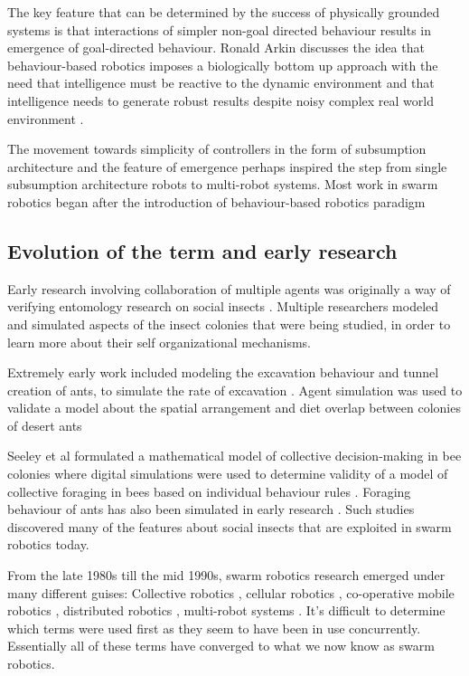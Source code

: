 The key feature that can be determined by the success of physically grounded systems is that interactions of simpler non-goal directed behaviour results in emergence of goal-directed behaviour. Ronald Arkin discusses the idea that behaviour-based robotics imposes a biologically bottom up approach with the need that intelligence must be reactive to the dynamic environment and that intelligence needs to generate robust results despite noisy complex real world environment \cite{arkin1990integrating}.

The movement towards simplicity of controllers in the form of subsumption architecture and the feature of emergence perhaps inspired the step from single subsumption architecture robots to multi-robot systems. Most work in swarm robotics began after the introduction of behaviour-based robotics paradigm \cite{arai2002editorial}

\subsection{Evolution of the term and early research}
\label{early-research}

Early research involving collaboration of multiple agents was originally a way of verifying entomology research on social insects \cite{dorigo2014swarm, beni1993swarm, seeley2009wisdom}. Multiple researchers modeled and simulated aspects of the insect colonies that were being studied, in order to learn more about their self organizational mechanisms. 

Extremely early work included modeling the excavation behaviour and tunnel creation of ants, to simulate the rate of excavation \cite{sudd1975model}. Agent simulation was used to validate a model about the spatial arrangement and diet overlap between colonies of desert ants \cite{ryti1984spatial} 

Seeley et al \cite{seeley1991collective} formulated a mathematical model of collective decision-making in bee colonies where digital simulations were used to determine validity of a model of collective foraging in bees based on individual behaviour rules \cite{de1998modelling}. Foraging behaviour of ants has also been simulated in early research \cite{lopez1987optimal}. Such studies discovered many of the features about social insects that are exploited in swarm robotics today.

From the late 1980s till the mid 1990s, swarm robotics research emerged under many different guises: Collective robotics \cite{kube1993collective}, cellular robotics \cite{freund1984design}, co-operative mobile robotics \cite{cao1997cooperative}, distributed robotics \cite{asama2013distributed}, multi-robot systems \cite{mataric1995cooperative}. It's difficult to determine which terms were used first as they seem to have been in use concurrently. Essentially all of these terms have converged to what we now know as swarm robotics.

